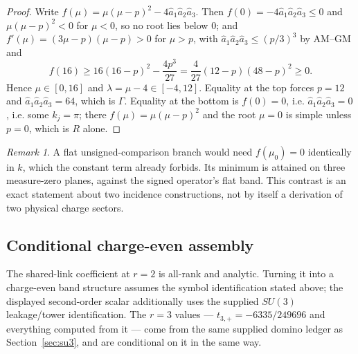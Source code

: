 \documentclass[11pt]{article}
\theoremstyle{plain}
\theoremstyle{definition}
\theoremstyle{remark}
\newtheorem{remark}[theorem]{Remark}
\newcommand{\chk}[1]{}
\begin{document}
\begin{proof}
Write $f(\mu)=\mu(\mu-p)^2-4\hat a_1\hat a_2\hat a_3$. Then
$f(0)=-4\hat a_1\hat a_2\hat a_3\le0$ and $\mu(\mu-p)^2<0$ for $\mu<0$, so no
root lies below $0$; and $f'(\mu)=(3\mu-p)(\mu-p)>0$ for $\mu>p$, with
$\hat a_1\hat a_2\hat a_3\le(p/3)^3$ by AM--GM and
\[
 f(16)\ge16(16-p)^2-\frac{4p^3}{27}
 =\frac4{27}(12-p)(48-p)^2\ge0.
\]
Hence $\mu\in[0,16]$ and
$\lambda=\mu-4\in[-4,12]$. Equality at the top forces $p=12$ and
$\hat a_1\hat a_2\hat a_3=64$, which is $\Gamma$. Equality at the bottom is
$f(0)=0$, i.e. $\hat a_1\hat a_2\hat a_3=0$, i.e. some $k_j=\pi$; there
$f(\mu)=\mu(\mu-p)^2$ and the root $\mu=0$ is simple unless $p=0$, which is
$R$ alone.
\end{proof}
\chk{the C-even range [-4, 12] is exact; the top only at Gamma, the floor on three planes}
\chk{the C-even band touches its floor exactly on the three planes k\_j = pi}

\begin{remark}
A flat unsigned-comparison branch would need $f(\mu_0)=0$ identically in $k$,
which the constant term already forbids. Its minimum is attained on three
measure-zero planes, against the signed operator's flat band. This contrast is
an exact statement about two incidence constructions, not by itself a
derivation of two physical charge sectors.
\chk{the C-even band touches its floor exactly on the three planes k\_j = pi}
\chk{the C-even spectra at the four high-symmetry momenta}
\end{remark}

\subsection{Conditional charge-even assembly}

The shared-link coefficient at $r=2$ is all-rank and analytic. Turning it into
a charge-even band structure assumes the symbol identification stated above;
the displayed second-order scalar additionally uses the supplied
$SU(3)$ leakage/tower identification. The $r=3$ values ---
$t_{3,+}=-6335/249696$ and everything computed from it --- come from the same
supplied domino ledger as Section~\ref{sec:su3}, and are conditional on it in
the same way.
\end{document}
